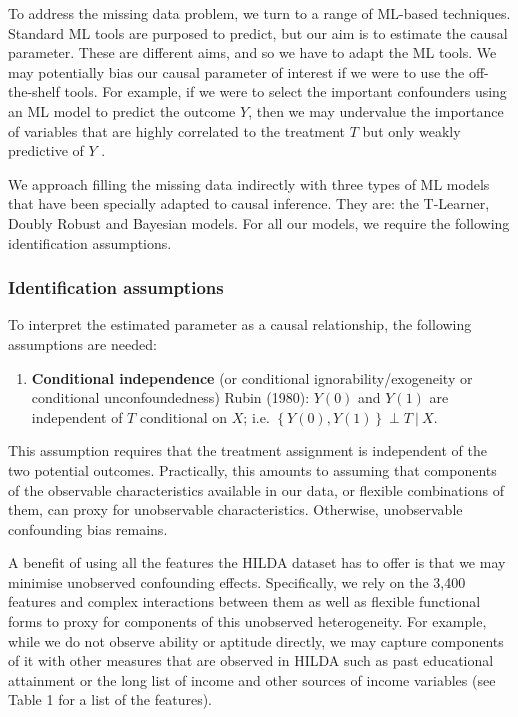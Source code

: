 \documentclass[12pt, a4paper]{article}
\begin{document}
To address the missing data problem, we turn to a range of ML-based techniques.
Standard ML tools are purposed to predict, but our aim is to estimate the
causal parameter. These are different aims, and so we have to adapt the ML
tools. We may potentially bias our causal parameter of interest if we were to
use the off-the-shelf tools. For example, if we were to select the important
confounders using an ML model to predict the outcome $Y$, then we may
undervalue the importance of variables that are highly correlated to the
treatment $T$ but only weakly predictive of $Y$ \citep{cherno2018}.

We approach filling the missing data indirectly with three types of ML models
that have been specially adapted to causal inference. They are: the T-Learner,
Doubly Robust and Bayesian models. For all our models, we require the following identification assumptions.

\subsubsection*{Identification assumptions}

To interpret the estimated parameter as a causal relationship, the following assumptions are needed:

\begin{enumerate}
  \item \textbf{Conditional independence} (or conditional ignorability/exogeneity or conditional unconfoundedness) Rubin (1980): $Y(0)$ and $Y(1)$ are independent of $T$ conditional on $X$; i.e. $\left\{Y(0), Y(1)\right\} \perp T~|~X$.  
\end{enumerate}

This assumption requires that the treatment assignment is independent of the two potential outcomes. Practically, this amounts to assuming that components of the observable characteristics available in our data, or flexible combinations of them, can proxy for unobservable characteristics. Otherwise, unobservable confounding bias remains.

A benefit of using all the features the HILDA dataset has to offer is that we may minimise unobserved confounding effects. Specifically, we rely on the 3,400 features and complex interactions between them as well as flexible functional forms to proxy for components of this unobserved heterogeneity. For example, while we do not observe ability or aptitude directly, we may capture components of it with other measures that are observed in HILDA such as past educational attainment or the long list of income and other sources of income variables (see Table 1 for a list of the features). 
\end{document}
